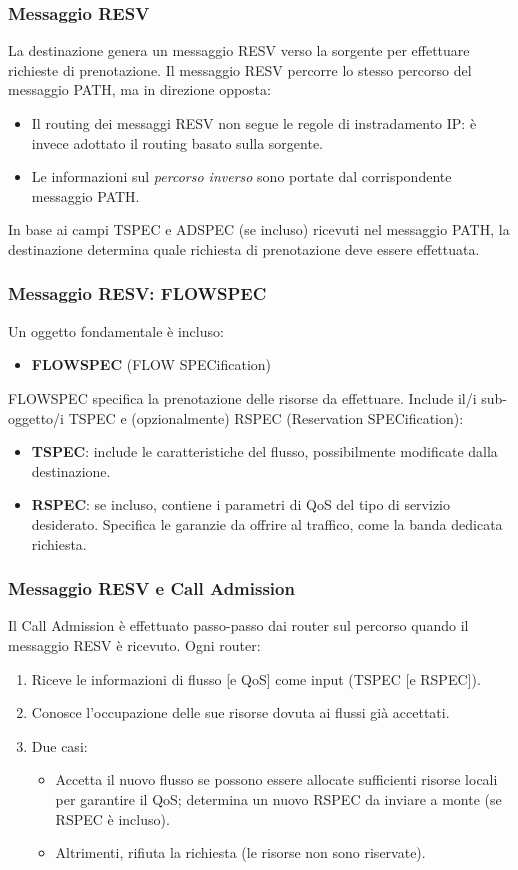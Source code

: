 \subsubsection{Messaggio RESV}
La destinazione genera un messaggio RESV verso la sorgente per effettuare richieste di prenotazione. Il messaggio RESV percorre lo stesso percorso del messaggio PATH, ma in direzione opposta:
\begin{itemize}
	\item Il routing dei messaggi RESV non segue le regole di instradamento IP: è invece adottato il routing basato sulla sorgente.
	\item Le informazioni sul \textit{percorso inverso} sono portate dal corrispondente messaggio PATH.
\end{itemize}

In base ai campi TSPEC e ADSPEC (se incluso) ricevuti nel messaggio PATH, la destinazione determina quale richiesta di prenotazione deve essere effettuata.

\subsubsection{Messaggio RESV: FLOWSPEC}
Un oggetto fondamentale è incluso:
\begin{itemize}
	\item \textbf{FLOWSPEC} (FLOW SPECification)
\end{itemize}

FLOWSPEC specifica la prenotazione delle risorse da effettuare. Include il/i sub-oggetto/i TSPEC e (opzionalmente) RSPEC (Reservation SPECification):
\begin{itemize}
	\item \textbf{TSPEC}: include le caratteristiche del flusso, possibilmente modificate dalla destinazione.
	\item \textbf{RSPEC}: se incluso, contiene i parametri di QoS del tipo di servizio desiderato. Specifica le garanzie da offrire al traffico, come la banda dedicata richiesta.
\end{itemize}

\subsubsection{Messaggio RESV e Call Admission}
Il Call Admission è effettuato passo-passo dai router sul percorso quando il messaggio RESV è ricevuto. Ogni router:
\begin{enumerate}
	\item Riceve le informazioni di flusso [e QoS] come input (TSPEC [e RSPEC]).
	\item Conosce l'occupazione delle sue risorse dovuta ai flussi già accettati.
	\item Due casi:
	\begin{itemize}
		\item Accetta il nuovo flusso se possono essere allocate sufficienti risorse locali per garantire il QoS; determina un nuovo RSPEC da inviare a monte (se RSPEC è incluso).
		\item Altrimenti, rifiuta la richiesta (le risorse non sono riservate).
	\end{itemize}
\end{enumerate}


